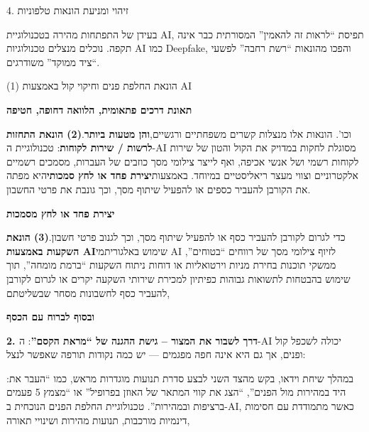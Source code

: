 
4. זיהוי ומניעת הונאות טלפוניות

בעידן של התפתחות מהירה בטכנולוגיית AI, תפיסת “לראות זה להאמין” המסורתית כבר אינה תקפה. נוכלים מנצלים טכנולוגיות AI כמו Deepfake, והפכו מהונאות “רשת רחבה” לפשעי “ציד ממוקד” משודרגים.


(1) הונאת החלפת פנים וחיקוי קול באמצעות AI


\textbf{תאונת דרכים פתאומית, הלוואה דחופה, חטיפה}\par

וכו'. הונאות אלו מנצלות קשרים משפחתיים ורגשיים,\textbf{והן מטעות ביותר}.\textbf{(2) הונאת התחזות לרשות / שירות לקוחות}: טכנולוגיית ה-AI מסוגלת לחקות במדויק את הקול והטון של שירות לקוחות רשמי ושל אנשי אכיפה, ואף לייצר צילומי מסך כוזבים של העברות, מסמכים רשמיים אלקטרוניים וצווי מעצר ריאליסטיים במיוחד. באמצעות\textbf{יצירת פחד או לחץ סמכותי}היא מפתה את הקורבן להעביר כספים או להפעיל שיתוף מסך, וכך גונבת את פרטי החשבון.

\textbf{יצירת פחד או לחץ מסמכות}\par

כדי לגרום לקורבן להעביר כסף או להפעיל שיתוף מסך, וכך לגנוב פרטי חשבון.\textbf{(3) הונאת השקעות באמצעות AI}שימוש באלגוריתמי AI לזיוף צילומי מסך של רווחים “בטוחים”, ממשקי תוכנות בחירת מניות וירטואליות או דוחות ניתוח השקעות “ברמת מומחה”, תוך שימוש בהבטחות לתשואות גבוהות כפיתיון למכירת שירותי השקעה יקרים או לגרום לקורבן להעביר כסף לחשבונות מסחר שבשליטתם,

\textbf{ובסוף לברוח עם הכסף}\par

\textbf{2. דרך לשבור את המצור – גישת ההגנה של “מראת הקסם”}: ה-AI יכולה לשכפל קול ופנים, אך גם היא אינה חפה מפגמים — יש כמה נקודות תורפה שאפשר לנצל:


:במהלך שיחת וידאו, בקש מהצד השני לבצע סדרת תנועות מוגדרות מראש, כמו “העבר את היד במהירות מול הפנים”, “הצג את קווי המתאר של האוזן בפרופיל” או “מצמץ 5 פעמים ברציפות ובמהירות”. טכנולוגיית החלפת הפנים הנוכחית ב-AI, כאשר מתמודדת עם חסימות דינמיות מורכבות, תנועות מהירות ושינויי תאורה,

